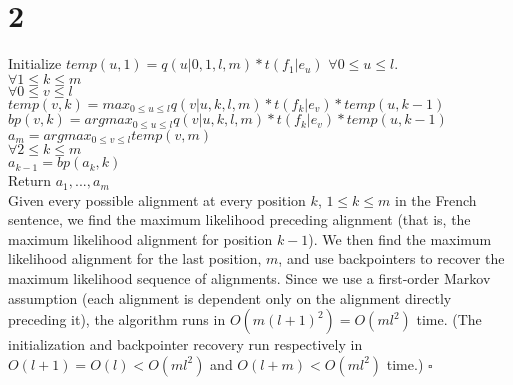 \documentclass[twoside]{homework}
\begin{document}
\section*{2}
Initialize $temp(u,1) = q(u|0,1,l,m) * t(f_1|e_u)$ $\forall 0 \leq u \leq l$. \\
$\forall 1 \leq k \leq m$ \\
\indent $\forall 0 \leq v \leq l$ \\
\indent \indent $temp(v,k) = max_{0 \leq u \leq l} q(v|u,k,l,m) * t(f_k|e_v) * temp(u,k-1)$ \\
\indent \indent $bp(v,k) = argmax_{0 \leq u \leq l} q(v|u,k,l,m) * t(f_k|e_v) * temp(u,k-1)$ \\
$a_m = argmax_{0 \leq v \leq l} temp(v,m)$ \\
$\forall 2 \leq k \leq m$ \\
\indent $a_{k-1} = bp(a_{k},k)$ \\
Return $a_1, ..., a_m$ \\
Given every possible alignment at every position $k$, $1 \leq k \leq m$ in the French sentence, we find the maximum likelihood preceding alignment (that is, the maximum likelihood alignment for position $k-1$).  We then find the maximum likelihood alignment for the last position, $m$, and use backpointers to recover the maximum likelihood sequence of alignments.  Since we use a first-order Markov assumption (each alignment is dependent only on the alignment directly preceding it), the algorithm runs in $O(m(l+1)^2) = O(ml^2)$ time.  (The initialization and backpointer recovery run respectively in $O(l+1) = O(l) < O(ml^2)$ and $O(l+m) < O(ml^2)$ time.)
$\square$
\end{document}

